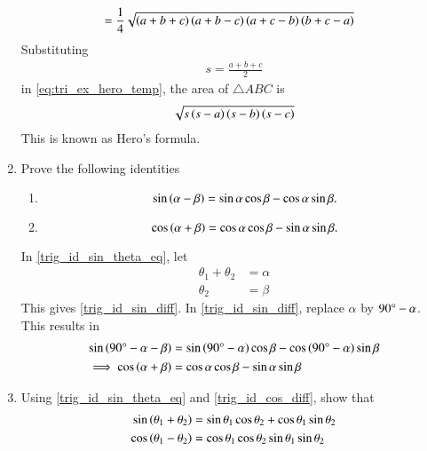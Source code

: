 \begin{enumerate}[label=\thesection.\arabic*.,ref=\thesection.\theenumi]
{\begin{align}
\\
&= \frac{1}{4}\sqrt{\left(a+b+c\right)\left(a+b-c\right)\left(a+c-b\right)\left(b+c-a\right)}
\label{eq:tri_ex_hero_temp}
\end{align}
}
Substituting 
%
\begin{align}
s=\frac{a+b+c}{2}
\end{align}
%
in \eqref{eq:tri_ex_hero_temp}, the area of $\triangle ABC$ is 
%
\begin{align}
\label{eq:tri_area_hero}
\sqrt{s\left(s-a\right)\left(s-b\right)\left(s-c\right)}
\end{align}
%
This is known as Hero's formula.
\item
	Prove the following identities 
	\begin{enumerate}
\item 
\begin{equation}
		\label{trig_id_sin_diff}
\sin\left(\alpha - \beta\right) = \sin \alpha \cos \beta - \cos \alpha \sin \beta.
\end{equation}
\item 
\begin{equation}
\cos\left(\alpha + \beta\right) = \cos \alpha \cos \beta - \sin \alpha \sin \beta.
		\label{trig_id_cos_diff}
\end{equation}

	\end{enumerate}

\solution In \eqref{trig_id_sin_theta_eq}, let
%
\begin{equation}
\begin{split}
\theta_1 + \theta_2 &= \alpha \\
\theta_2 &=  \beta
\end{split}
\end{equation}
%
This gives \eqref{trig_id_sin_diff}.  In \eqref{trig_id_sin_diff}, replace $\alpha$ by 
%
$90{\degree} - \alpha$.  This results in
%
\begin{align}
\sin\left(90{\degree} - \alpha - \beta\right)
	&=
\sin \left(90{\degree} -\alpha\right) \cos \beta - \cos \left(90{\degree} -\alpha\right) \sin \beta \\
	\implies \cos\left(\alpha + \beta\right) &= \cos \alpha \cos \beta - \sin \alpha \sin \beta
\end{align}
% 
\item
	Using \eqref{trig_id_sin_theta_eq} and \eqref{trig_id_cos_diff}, show that
\begin{align}
\label{trig_id_sin_sum}
\sin\left(\theta_1 + \theta_2\right) &= \sin\theta_1  \cos\theta_2 + \cos\theta_1\sin\theta_2
\\
\cos\left(\theta_1 - \theta_2\right) &= \cos\theta_1  \cos\theta_2  \sin\theta_1\sin\theta_2
\label{trig_id_cos_sum}
\end{align}


\end{enumerate}
